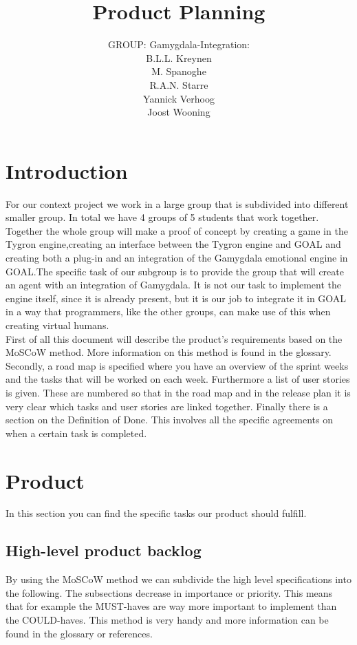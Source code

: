 \documentclass[]{article}
\title{Product Planning}
\author{GROUP: Gamygdala-Integration:\\
	B.L.L. Kreynen\\
	M. Spanoghe\\
	R.A.N. Starre\\
	Yannick Verhoog\\
	Joost Wooning\\
	}
\begin{document}
\maketitle
\pagebreak
\tableofcontents
\pagebreak
\section{Introduction}
For our context project we work in a large group that is subdivided into different smaller group. In total we have 4 groups of 5 students that work together. Together the whole group will make a proof of concept by creating a game in the Tygron engine\cite{Tygron},creating an interface between the Tygron engine and \gls{GOAL} and creating both a plug-in and an integration of the \gls{Gamygdala} emotional engine in GOAL.The specific task of our subgroup is to provide the group that will create an agent with an integration of Gamygdala. It is not our task to implement the engine itself, since it is already present, but it is our job to integrate it in GOAL in a way that programmers, like the other groups, can make use of this when creating virtual humans.
\\
First of all this document will describe the product's requirements based on the MoSCoW method. More information on this method is found in the glossary. Secondly, a road map is specified where you have an overview of the sprint weeks and the tasks that will be worked on each week. Furthermore a list of user stories is given. These are numbered so that in the road map and in the release plan it is very clear which tasks and user stories are linked together. Finally there is a section on the Definition of Done. This involves all the specific agreements on when a certain task is completed. 
\section{Product}
In this section you can find the specific tasks our product should fulfill.
\subsection{High-level product backlog}
By using the \gls{MoSCoW} method we can subdivide the high level specifications into the following. The subsections decrease in importance or priority. This means that for example the MUST-haves are way more important to implement than the COULD-haves. This method is very handy and more information can be found in the glossary or references.
\end{document}
